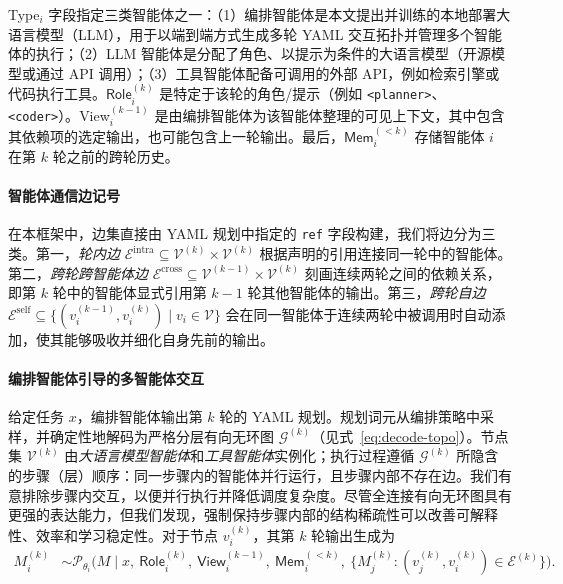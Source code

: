 \documentclass{article}
\theoremstyle{definition}
\begin{document}
\textsf{Type}$_i$ 字段指定三类智能体之一：（1）编排智能体是本文提出并训练的本地部署大语言模型（LLM），用于以端到端方式生成多轮 YAML 交互拓扑并管理多个智能体的执行；（2）LLM 智能体是分配了角色、以提示为条件的大语言模型（开源模型或通过 API 调用）；（3）工具智能体配备可调用的外部 API，例如检索引擎或代码执行工具。$\textsf{Role}_i^{(k)}$ 是特定于该轮的角色/提示（例如 \texttt{<planner>}、\texttt{<coder>}）。\textsf{View}$_i^{(k-1)}$ 是由编排智能体为该智能体整理的可见上下文，其中包含其依赖项的选定输出，也可能包含上一轮输出。最后，$\textsf{Mem}_i^{(<k)}$ 存储智能体 $i$ 在第 $k$ 轮之前的跨轮历史。

\paragraph{智能体通信边记号}
在本框架中，边集直接由 YAML 规划中指定的 \texttt{ref} 字段构建，我们将边分为三类。第一，\emph{轮内边} $\mathcal{E}^{\text{intra}} \subseteq \mathcal{V}^{(k)} \times \mathcal{V}^{(k)}$ 根据声明的引用连接同一轮中的智能体。第二，\emph{跨轮跨智能体边} $\mathcal{E}^{\text{cross}} \subseteq \mathcal{V}^{(k-1)} \times \mathcal{V}^{(k)}$ 刻画连续两轮之间的依赖关系，即第 $k$ 轮中的智能体显式引用第 $k\!-\!1$ 轮其他智能体的输出。第三，\emph{跨轮自边} $\mathcal{E}^{\text{self}} \subseteq \{(v_i^{(k-1)}, v_i^{(k)}) \mid v_i \in \mathcal{V}\}$ 会在同一智能体于连续两轮中被调用时自动添加，使其能够吸收并细化自身先前的输出。

\paragraph{编排智能体引导的多智能体交互}
给定任务 $x$，编排智能体输出第 $k$ 轮的 YAML 规划。规划词元从编排策略中采样，并确定性地解码为严格分层有向无环图 $\mathcal{G}^{(k)}$（见式~\ref{eq:decode-topo}）。节点集 $\mathcal{V}^{(k)}$ 由\emph{大语言模型智能体}和\emph{工具智能体}实例化；执行过程遵循 $\mathcal{G}^{(k)}$ 所隐含的步骤（层）顺序：同一步骤内的智能体并行运行，且步骤内部不存在边。我们有意排除步骤内交互，以便并行执行并降低调度复杂度。尽管全连接有向无环图具有更强的表达能力，但我们发现，强制保持步骤内部的结构稀疏性可以改善可解释性、效率和学习稳定性。对于节点 $v_i^{(k)}$，其第 $k$ 轮输出生成为
\begin{equation}
\begin{aligned}
M_i^{(k)} &\sim \mathcal{P}_{\theta_i}\!\big(M \mid x,\ \textsf{Role}_i^{(k)},\ \textsf{View}_i^{(k-1)},\ \textsf{Mem}_i^{(<k)},\ \{M_j^{(k)}:(v_j^{(k)},v_i^{(k)})\in\mathcal{E}^{(k)}\}\big).
\end{aligned}
\end{equation}
\end{document}
